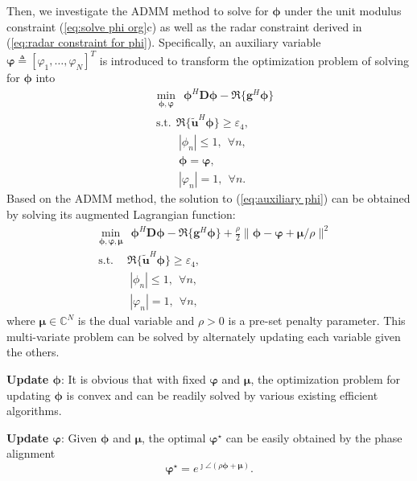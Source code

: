 \documentclass[Conference,a4paper]{IEEEtran}
\newcommand{\be}{\begin{equation}}
\newcommand{\ee}{\end{equation}}
\begin{document}
Then, we investigate the ADMM method to solve for $\bm{\phi}$ under the unit modulus constraint (\ref{eq:solve phi org}c) as well as the radar constraint derived in (\ref{eq:radar constraint for phi}).
Specifically, an auxiliary variable $\bm{\varphi}\triangleq[\varphi_1,\ldots,\varphi_N]^T$ is introduced to transform the optimization problem of solving for $\bm{\phi}$ into
\begin{subequations}\label{eq:auxiliary phi}\begin{align}
&\underset{\bm{\phi},\bm{\varphi}}\min~~\bm{\phi}^H\mathbf{D}\bm{\phi}-\Re\{\mathbf{g}^H\bm{\phi}\}\\
&~\text{s.t.}~~\Re\{\widetilde{\mathbf{u}}^H\bm{\phi}\}\geq \varepsilon_4,\\
&\quad\quad~|\phi_n| \leq 1,~~\forall n,\\
&\quad\quad~\bm{\phi} = \bm{\varphi},\\
&\quad\quad~|\varphi_n| = 1,~~\forall n.
\end{align}
\end{subequations}
Based on the ADMM method, the solution to (\ref{eq:auxiliary phi}) can be obtained by solving its augmented Lagrangian function:
\begin{subequations}\label{eq:solve for phi and variphi}
\begin{align}
&\underset{\bm{\phi},\bm{\varphi},\bm{\mu}}\min~~\bm{\phi}^H\mathbf{D}\bm{\phi}-\Re\{\mathbf{g}^H\bm{\phi}\} + \frac{\rho}{2}\|\bm{\phi}-\bm{\varphi}+\bm{\mu}/\rho\|^2\\
&~\text{s.t.}\quad~\Re\{\widetilde{\mathbf{u}}^H\bm{\phi}\}\geq \varepsilon_4,\\
&\quad\quad\quad|\phi_n| \leq 1,~~\forall n,\\
&\quad\quad\quad|\varphi_n| = 1,~~\forall n,
\end{align}
\end{subequations}
where $\bm{\mu}\in\mathbb{C}^N$ is the dual variable and $\rho>0$ is a pre-set penalty parameter.
This multi-variate problem can be solved by alternately updating each variable given the others.


\textbf{Update $\bm{\phi}$}:
It is obvious that with fixed $\bm{\varphi}$ and $\bm{\mu}$, the optimization problem for updating $\bm{\phi}$ is convex and can be readily solved by various existing efficient algorithms.


\textbf{Update $\bm{\varphi}$}:
Given $\bm{\phi}$ and $\bm{\mu}$, the optimal $\bm{\varphi}^\star$ can be easily obtained by the phase alignment
\be\label{eq:update varphi}
\bm{\varphi}^\star = e^{\jmath\angle(\rho\bm{\phi}+\bm{\mu})}.
\ee
\end{document}
